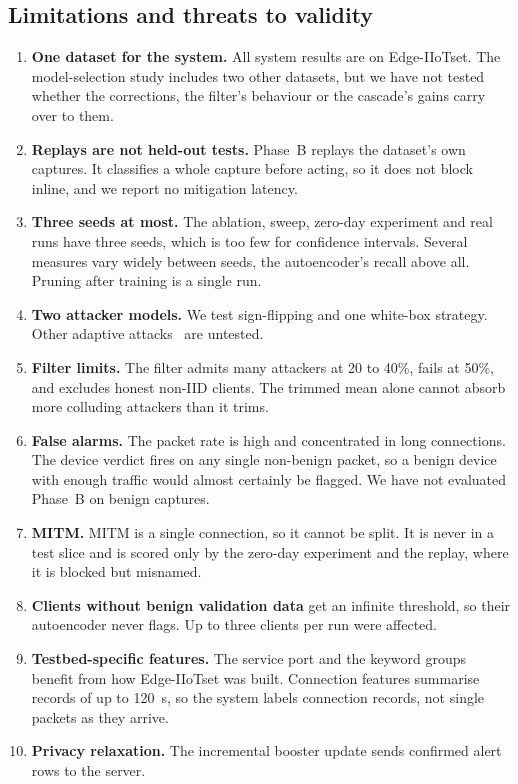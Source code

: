 \subsection{Limitations and threats to validity}
\begin{enumerate}
  \item \textbf{One dataset for the system.} All system results are on Edge-IIoTset. The model-selection study includes two other datasets, but we have not tested whether the corrections, the filter's behaviour or the cascade's gains carry over to them.
  \item \textbf{Replays are not held-out tests.} Phase~B replays the dataset's own captures. It classifies a whole capture before acting, so it does not block inline, and we report no mitigation latency.
  \item \textbf{Three seeds at most.} The ablation, sweep, zero-day experiment and real runs have three seeds, which is too few for confidence intervals. Several measures vary widely between seeds, the autoencoder's recall above all. Pruning after training is a single run.
  \item \textbf{Two attacker models.} We test sign-flipping and one white-box strategy. Other adaptive attacks~\cite{fang2020} are untested.
  \item \textbf{Filter limits.} The filter admits many attackers at 20 to 40\%, fails at 50\%, and excludes honest non-IID clients. The trimmed mean alone cannot absorb more colluding attackers than it trims.
  \item \textbf{False alarms.} The packet rate is high and concentrated in long connections. The device verdict fires on any single non-benign packet, so a benign device with enough traffic would almost certainly be flagged. We have not evaluated Phase~B on benign captures.
  \item \textbf{MITM.} MITM is a single connection, so it cannot be split. It is never in a test slice and is scored only by the zero-day experiment and the replay, where it is blocked but misnamed.
  \item \textbf{Clients without benign validation data} get an infinite threshold, so their autoencoder never flags. Up to three clients per run were affected.
  \item \textbf{Testbed-specific features.} The service port and the keyword groups benefit from how Edge-IIoTset was built. Connection features summarise records of up to 120~s, so the system labels connection records, not single packets as they arrive.
  \item \textbf{Privacy relaxation.} The incremental booster update sends confirmed alert rows to the server.

\end{enumerate}
